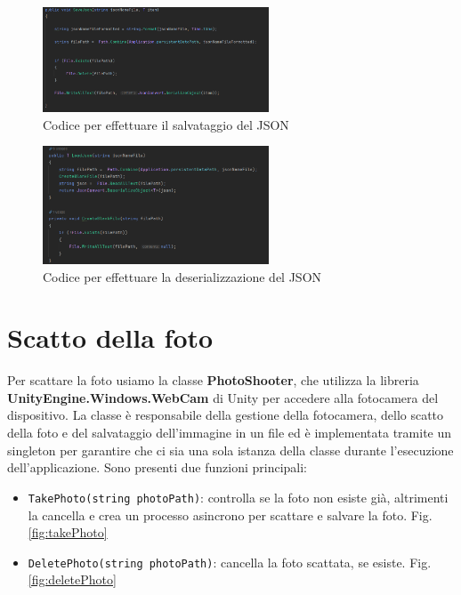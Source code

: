 \begin{figure}[H]
    \centering
    \includegraphics[width=0.6\textwidth,height=\textheight,keepaspectratio]{figures/chapter_1/saveJson_CODICE.png}
    \caption{Codice per effettuare il salvataggio del JSON}
    \label{fig:saveJson}
\end{figure}
\begin{figure}[H]
    \centering
    \includegraphics[width=0.6\textwidth,height=\textheight,keepaspectratio]{figures/chapter_1/LoadJson_CODICE.png}
    \caption{Codice per effettuare la deserializzazione del JSON}
    \label{fig:loadJson}
\end{figure}

\section{Scatto della foto}
Per scattare la foto usiamo la classe \textbf{PhotoShooter}, che utilizza la libreria \\ \textbf{UnityEngine.Windows.WebCam} di Unity per accedere alla fotocamera del dispositivo. La classe è responsabile della gestione della fotocamera, dello scatto della foto e del salvataggio dell'immagine in un file ed è implementata tramite un singleton per garantire che ci sia una sola istanza della classe durante l'esecuzione dell'applicazione.
Sono presenti due funzioni principali:
\begin{itemize}
    \item \texttt{TakePhoto(string photoPath)}: controlla se la foto non esiste già, altrimenti la cancella e crea un processo asincrono per scattare e salvare la foto. Fig.\ref{fig:takePhoto}
    \item \texttt{DeletePhoto(string photoPath)}: cancella la foto scattata, se esiste. Fig.\ref{fig:deletePhoto}
\end{itemize}

